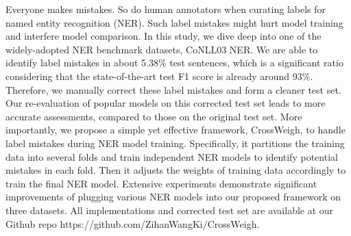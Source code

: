 Everyone makes mistakes. So do human annotators when curating labels for named entity recognition (NER).  Such label mistakes might hurt model training and interfere model comparison. In this study, we dive deep into one of the widely-adopted NER benchmark datasets, CoNLL03 NER. We are able to identify label mistakes in about 5.38\% test sentences, which is a significant ratio considering that the state-of-the-art test F1 score is already around 93\%. Therefore, we manually correct these label mistakes and form a cleaner test set. Our re-evaluation of popular models on this corrected test set leads to more accurate assessments, compared to those on the original test set. More importantly, we propose a simple yet effective framework, CrossWeigh, to handle label mistakes during NER model training. Specifically, it partitions the training data into several folds and train independent NER models to identify potential mistakes in each fold. Then it adjusts the weights of training data accordingly to train the final NER model. Extensive experiments demonstrate significant improvements of plugging various NER models into our proposed framework on three datasets. All implementations and corrected test set are available at our Github repo https://github.com/ZihanWangKi/CrossWeigh.